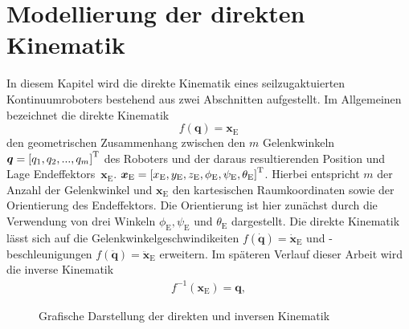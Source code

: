 \chapter{Modellierung der direkten Kinematik}

In diesem Kapitel wird die direkte Kinematik eines seilzugaktuierten Kontinuumroboters bestehend aus zwei Abschnitten aufgestellt. Im Allgemeinen bezeichnet die direkte Kinematik 
%
\begin{equation}
\label{eq:direkteKinematik}
f(\bm{q}) = \bm{x}_\mathrm{E}
\end{equation}
%
den geometrischen Zusammenhang zwischen den $m$ Gelenkwinkeln $\bm{q} = \left[q_1, q_2, ..., q_m \right]^{\mathrm{T}} $ des Roboters und der daraus resultierenden Position und Lage Endeffektors~$\bm{x}_\mathrm{E}$.
$\bm{x}_\mathrm{E} = \left[x_\mathrm{E}, y_\mathrm{E}, z_\mathrm{E}, \phi_\mathrm{E}, \psi_\mathrm{E}, \theta_\mathrm{E} \right]^{\mathrm{T}} $. Hierbei entspricht $m$ der Anzahl der Gelenkwinkel und $\bm{x}_\mathrm{E}$ den kartesischen Raumkoordinaten sowie der Orientierung des Endeffektors. Die Orientierung ist hier zunächst durch die Verwendung von drei Winkeln $\phi_\mathrm{E}, \psi_\mathrm{E}$ und $\theta_\mathrm{E}$ dargestellt. 
Die direkte Kinematik lässt sich auf die Gelenkwinkelgeschwindikeiten $f(\bm{\dot{q}}) = \bm{\dot{x}}_\mathrm{E} $ und -beschleunigungen $f(\bm{\ddot{q}}) = \bm{\ddot{x}}_\mathrm{E}$ erweitern. Im späteren Verlauf dieser Arbeit wird die inverse Kinematik
%
\begin{align}
f^{-1}(\bm{x}_\mathrm{E}) = \bm{q},
\label{eq:inverseKinematik}
\end{align}

\begin{figure}[b]
\centering
{}
\caption{Grafische Darstellung der direkten und inversen Kinematik}
\label{fig:kinematik}
\end{figure}

